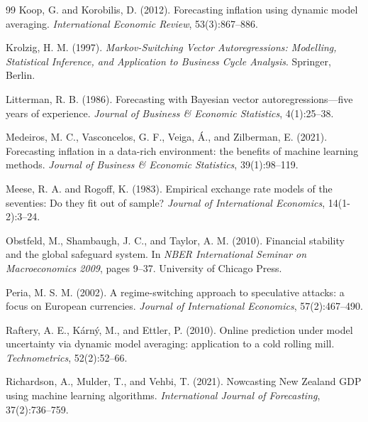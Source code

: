 \documentclass[12pt,a4paper]{article}
\begin{document}
\begin{thebibliography}{99}
Koop, G. and Korobilis, D. (2012).
\newblock Forecasting inflation using dynamic model averaging.
\newblock \textit{International Economic Review}, 53(3):867--886.

Krolzig, H. M. (1997).
\newblock \textit{Markov-Switching Vector Autoregressions: Modelling, Statistical Inference, and Application to Business Cycle Analysis}.
\newblock Springer, Berlin.

Litterman, R. B. (1986).
\newblock Forecasting with Bayesian vector autoregressions---five years of experience.
\newblock \textit{Journal of Business \& Economic Statistics}, 4(1):25--38.

Medeiros, M. C., Vasconcelos, G. F., Veiga, \'{A}., and Zilberman, E. (2021).
\newblock Forecasting inflation in a data-rich environment: the benefits of machine learning methods.
\newblock \textit{Journal of Business \& Economic Statistics}, 39(1):98--119.

Meese, R. A. and Rogoff, K. (1983).
\newblock Empirical exchange rate models of the seventies: Do they fit out of sample?
\newblock \textit{Journal of International Economics}, 14(1-2):3--24.

Obstfeld, M., Shambaugh, J. C., and Taylor, A. M. (2010).
\newblock Financial stability and the global safeguard system.
\newblock In \textit{NBER International Seminar on Macroeconomics 2009}, pages 9--37. University of Chicago Press.

Peria, M. S. M. (2002).
\newblock A regime-switching approach to speculative attacks: a focus on European currencies.
\newblock \textit{Journal of International Economics}, 57(2):467--490.

Raftery, A. E., K\'{a}rn\'{y}, M., and Ettler, P. (2010).
\newblock Online prediction under model uncertainty via dynamic model averaging: application to a cold rolling mill.
\newblock \textit{Technometrics}, 52(2):52--66.

Richardson, A., Mulder, T., and Vehbi, T. (2021).
\newblock Nowcasting New Zealand GDP using machine learning algorithms.
\newblock \textit{International Journal of Forecasting}, 37(2):736--759.


\end{thebibliography}
\end{document}
